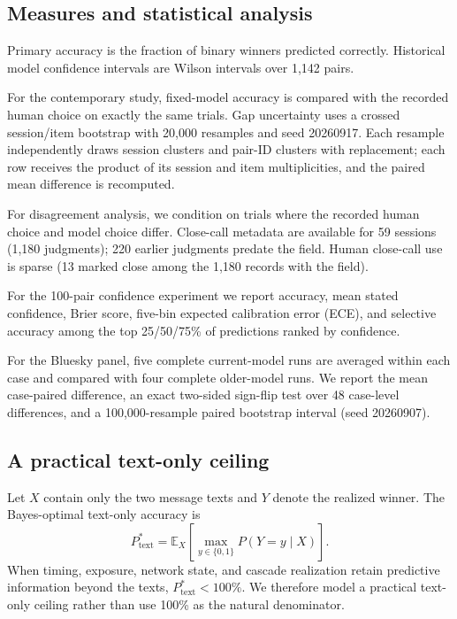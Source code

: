 \documentclass[10pt,twocolumn]{article}
\begin{document}
\subsection{Measures and statistical analysis}
Primary accuracy is the fraction of binary winners predicted correctly. Historical model confidence intervals are Wilson intervals over 1,142 pairs.

For the contemporary study, fixed-model accuracy is compared with the recorded human choice on exactly the same trials. Gap uncertainty uses a crossed session/item bootstrap with 20,000 resamples and seed 20260917. Each resample independently draws session clusters and pair-ID clusters with replacement; each row receives the product of its session and item multiplicities, and the paired mean difference is recomputed.

For disagreement analysis, we condition on trials where the recorded human choice and model choice differ. Close-call metadata are available for 59 sessions (1,180 judgments); 220 earlier judgments predate the field. Human close-call use is sparse (13 marked close among the 1,180 records with the field).

For the 100-pair confidence experiment we report accuracy, mean stated confidence, Brier score, five-bin expected calibration error (ECE), and selective accuracy among the top 25/50/75\% of predictions ranked by confidence.

For the Bluesky panel, five complete current-model runs are averaged within each case and compared with four complete older-model runs. We report the mean case-paired difference, an exact two-sided sign-flip test over 48 case-level differences, and a 100,000-resample paired bootstrap interval (seed 20260907).

\subsection{A practical text-only ceiling}\label{sec:ceiling}
Let $X$ contain only the two message texts and $Y$ denote the realized winner. The Bayes-optimal text-only accuracy is
\begin{equation}
P^*_{\mathrm{text}}=\mathbb{E}_X\!\left[\max_{y\in\{0,1\}}P(Y=y\mid X)\right].
\label{eq:bayes_text}
\end{equation}
When timing, exposure, network state, and cascade realization retain predictive information beyond the texts, $P^*_{\mathrm{text}}<100\%$. We therefore model a practical text-only ceiling rather than use 100\% as the natural denominator.
\end{document}
